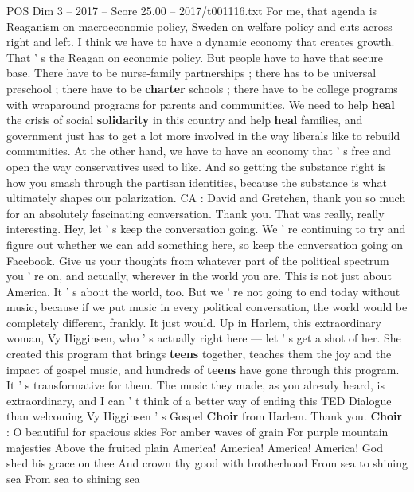 \begin{textsample}{POS Dim 3 – 2017 – Score 25.00 – 2017/t001116.txt}
For me, that agenda is Reaganism on macroeconomic policy, Sweden on welfare policy and cuts across right and left.
I think we have to have a dynamic economy that creates growth.
That ' s the Reagan on economic policy.
But people have to have that secure base.
There have to be nurse-family partnerships ; there has to be universal preschool ; there have to be \textbf{charter} schools ; there have to be college programs with wraparound programs for parents and communities.
We need to help \textbf{heal} the crisis of social \textbf{solidarity} in this country and help \textbf{heal} families, and government just has to get a lot more involved in the way liberals like to rebuild communities.
At the other hand, we have to have an economy that ' s free and open the way conservatives used to like.
And so getting the substance right is how you smash through the partisan identities, because the substance is what ultimately shapes our polarization.
CA : David and Gretchen, thank you so much for an absolutely fascinating conversation.
Thank you.
That was really, really interesting.
Hey, let ' s keep the conversation going.
We ' re continuing to try and figure out whether we can add something here, so keep the conversation going on Facebook.
Give us your thoughts from whatever part of the political spectrum you ' re on, and actually, wherever in the world you are.
This is not just about America.
It ' s about the world, too.
But we ' re not going to end today without music, because if we put music in every political conversation, the world would be completely different, frankly.
It just would.
Up in Harlem, this extraordinary woman, Vy Higginsen, who ' s actually right here — let ' s get a shot of her.
She created this program that brings \textbf{teens} together, teaches them the joy and the impact of gospel music, and hundreds of \textbf{teens} have gone through this program.
It ' s transformative for them.
The music they made, as you already heard, is extraordinary, and I can ' t think of a better way of ending this TED Dialogue than welcoming Vy Higginsen ' s Gospel \textbf{Choir} from Harlem.
Thank you. \textbf{Choir} : O beautiful for spacious skies For amber waves of grain For purple mountain majesties Above the fruited plain America!
America!
America!
America!
God shed his grace on thee And crown thy good with brotherhood From sea to shining sea From sea to shining sea

\end{textsample}
